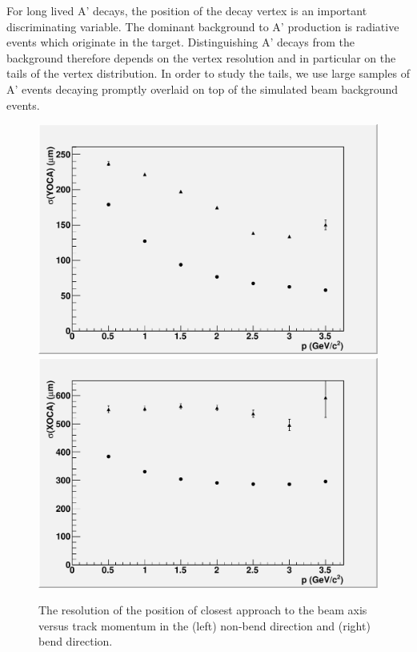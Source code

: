 For long lived A' decays, the position of the decay vertex is an important discriminating 
variable.  The dominant background to A' production is radiative events which originate 
in the target. Distinguishing A' decays from the background therefore depends on the vertex 
resolution and in particular on the tails of the vertex distribution. In order to study 
the tails, we use large samples of A' events decaying promptly overlaid on top of the 
simulated beam background events.
   
\begin{figure}
\includegraphics[scale=0.4]{TrackingPerformance/yoca-MomResolution.pdf}
\includegraphics[scale=0.4]{TrackingPerformance/xoca-MomResolution.pdf}
\caption{The resolution of the position of closest approach to the beam axis 
versus track momentum in the (left) non-bend direction and (right) bend direction.}
 \label{fig:doca}
\end{figure}

